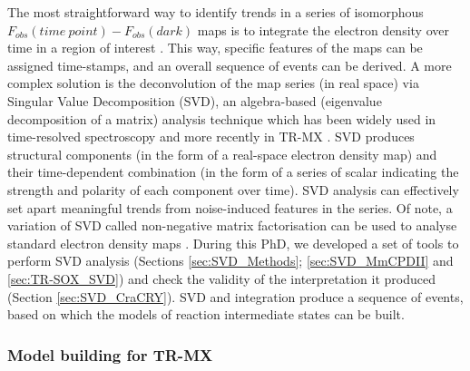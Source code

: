 The most straightforward way to identify trends in a series of isomorphous \(F_{obs}(time\ point) - F_{obs}(dark)\) maps is to integrate the electron density over time in a region of interest \cite{wickstrandToolVisualizingProtein2020}. This way, specific features of the maps can be assigned time-stamps, and an overall sequence of events can be derived. A more complex solution is the deconvolution of the map series (in real space) via Singular Value Decomposition (SVD), an algebra-based (eigenvalue decomposition of a matrix) analysis technique which has been widely used in time-resolved spectroscopy \parencite{henrySingularValueDecomposition1992,henryUseMatrixMethods1997} and more recently in TR-MX \parencite{schmidtApplicationSingularValue2003}. SVD produces structural components (in the form of a real-space electron density map) and their time-dependent combination (in the form of a series of scalar indicating the strength and polarity of each component over time). SVD analysis can effectively set apart meaningful trends from noise-induced features in the series. Of note, a variation of SVD called non-negative matrix factorisation can be used to analyse standard electron density maps \parencite{christouTimeresolvedCrystallographyCaptures2023a}. During this PhD, we developed a set of tools to perform SVD analysis (Sections  \ref{sec:SVD_Methods}; \ref{sec:SVD_MmCPDII} and \ref{sec:TR-SOX_SVD}) and check the validity of the interpretation it produced (Section \ref{sec:SVD_CraCRY}). SVD and integration produce a sequence of events, based on which the models of reaction intermediate states can be built.

\subsubsection{Model building for TR-MX}

